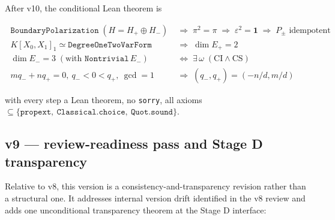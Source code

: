 \smallskip
After v10, the conditional Lean theorem is

\[
\boxed{\;
\begin{aligned}
\texttt{BoundaryPolarization}\;(H = H_+ \oplus H_-)
&\;\Rightarrow\; \pi^2 = \pi
\;\Rightarrow\; \varepsilon^2 = \mathbf 1
\;\Rightarrow\; P_\pm \text{ idempotent} \\
K[X_0, X_1]_1 \simeq \texttt{DegreeOneTwoVarForm}
&\;\Rightarrow\; \dim E_+ = 2 \\
\dim E_- = 3\;(\text{with }\texttt{Nontrivial}\,E_-)
&\;\iff\; \exists\,\omega\;(\textrm{CI} \wedge \textrm{CS}) \\
m q_- + n q_+ = 0,\ q_- < 0 < q_+,\ \gcd = 1
&\;\Rightarrow\; (q_-, q_+) = (-n/d, m/d)
\end{aligned}
\;}
\]

with every step a Lean theorem, no \texttt{sorry}, all axioms
$\subseteq\{\texttt{propext},\ \texttt{Classical.choice},\
\texttt{Quot.sound}\}$.

\subsection*{v9 --- review-readiness pass and Stage D transparency}

Relative to v8, this version is a consistency-and-transparency
revision rather than a structural one. It addresses internal
version drift identified in the v8 review and adds one
unconditional transparency theorem at the Stage D interface:

